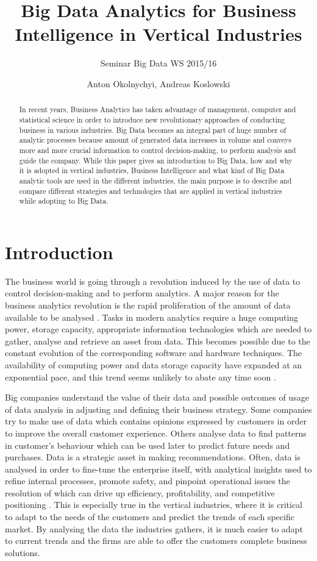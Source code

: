 \documentclass[runningheads]{llncs}
\title{Big Data Analytics for Business Intelligence in Vertical Industries}
\subtitle{Seminar Big Data WS 2015/16}
\author{Anton Okolnychyi, Andreas Koslowski}
\institute{RWTH Aachen University, 52056 Aachen, Germany\\
\{anton.okolnychyi, andreas.koslowski\}@rwth-aachen.de}
\begin{document}
\maketitle

\begin{abstract}
In recent years, Business Analytics has taken advantage of management, computer and statistical science in order to introduce new revolutionary approaches of conducting business in various industries. Big Data becomes an integral part of huge number of analytic processes because amount of generated data increases in volume and conveys more and more crucial information to control decision-making, to perform analysis and guide the company. 
While this paper gives an introduction to Big Data, how and why it is adopted in vertical industries, Business Intelligence and what kind of Big Data analytic tools are used in the different industries, the main purpose is to describe and compare different strategies and technologies that are applied in vertical industries while adopting to Big Data. 
\end{abstract}

\section{Introduction}
The business world is going through a revolution induced by the use of data to control decision-making and to perform analytics. A major reason for the business analytics revolution is the rapid proliferation of the amount of data available to be analysed \cite{Gopalkrishnan}. Tasks in modern analytics require a huge computing power, storage capacity, appropriate information technologies which are needed to gather, analyse and retrieve an asset from data. This becomes possible due to the constant evolution of the corresponding software and hardware techniques. The availability of computing power and data storage capacity have expanded at an exponential pace, and this trend seems unlikely to abate any time soon \cite{NYTIMES}.  

Big companies understand the value of their data and possible outcomes of usage of data analysis in adjusting and defining their business strategy.  Some companies try to make use of data which contains opinions expressed by customers in order to improve the overall customer experience. Others analyse data to find patterns in customer's behaviour which can be used later to predict future needs and purchases. Data is a strategic asset in making recommendations. Often, data is analysed in order to fine-tune the enterprise itself, with analytical insights used to refine internal processes, promote safety, and pinpoint operational issues the resolution of which can drive up efficiency, profitability, and competitive positioning \cite{Guszcza}.
This is especially true in the vertical industries, where it is critical to adapt to the needs of the customers and predict the trends of each specific market. By analysing the data the industries gathers, it is much easier to adapt to current trends and the firms are able to offer the customers complete business solutions.
\end{document}

